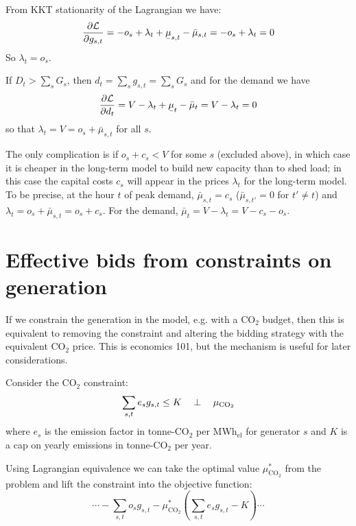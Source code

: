 \documentclass[final,3p,times]{elsarticle}
\def\el{${}_{\textrm{el}}$}
\newcommand{\ubar}[1]{\text{\b{$#1$}}}
\def\l{\lambda}
\def\d{\partial}
\def\cL{\mathcal{L}}
\begin{document}
From KKT stationarity of the Lagrangian we have:
\begin{align}
\frac{\d \cL}{\d g_{s,t}} =  -o_s + \l_t + \ubar{\mu}_{s,t} - \bar{\mu}_{s,t}  =  -o_s + \l_t = 0
\end{align}
So $\l_t = o_s$.

If $D_t > \sum_s G_{s}$, then $d_t = \sum_s g_{s,t} = \sum_s G_{s}$ and for the demand we have
\begin{align}
\frac{\d \cL}{\d d_{t}} =  V -\l_t + \ubar{\mu}_{t} - \bar{\mu}_{t}  =  V - \l_t = 0
\end{align}
so that $\l_t = V = o_s + \bar{\mu}_{s,t}$ for all $s$.

The only complication is if $o_s + c_s < V$ for some $s$ (excluded
above), in which case it is cheaper in the long-term model to build
new capacity than to shed load; in this case the capital costs $c_s$
will appear in the prices $\l_t$ for the long-term model. To be precise, at the hour $t$ of
peak demand, $\bar{\mu}_{s,t} = c_s$ ($\bar{\mu}_{s,t'} =0$ for $t'
\neq t$) and $\l_t = o_s + \bar{\mu}_{s,t} = o_s + c_s$. For the demand, $\bar{\mu}_{t} = V - \l_t = V - c_s - o_s$.





\section{Effective bids from constraints on generation}\label{sec:effective}


If we constrain the generation in the model, e.g. with a CO$_2$ budget, then this is equivalent to removing the constraint and altering the bidding strategy with the equivalent CO$_2$ price. This is economics 101, but the mechanism is useful for later considerations.

Consider the CO$_2$ constraint:
\begin{equation}
  \sum_{s,t} e_s g_{s,t} \leq K \hspace{0.34cm}\perp \hspace{0.34cm} \mu_{\textrm{CO}_2} \label{eq:co2}
\end{equation}
where $e_s$ is the emission factor in tonne-CO$_2$ per MWh\el{} for
generator $s$ and $K$ is a cap on yearly emissions in tonne-CO$_2$ per
year.

Using Lagrangian equivalence we can take the optimal value $\mu^*_{\textrm{CO}_2}$ from the problem and lift the constraint into the objective function:
\begin{equation}
  \cdots -\sum_{s,t} o_s g_{s,t}   - \mu^*_{\textrm{CO}_2} \left(\sum_{s,t} e_s g_{s,t} - K \right) \cdots
\end{equation}
\end{document}
